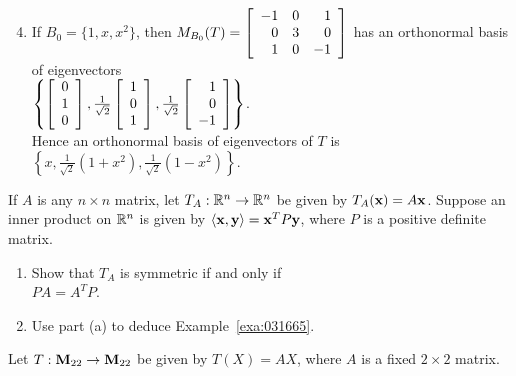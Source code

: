 \begin{multicols}{2}
\begin{ex}
\begin{sol}
\begin{enumerate}[label={\alph*.}]
\setcounter{enumi}{3}
\item If $B_{0} = \{1, x, x^{2}\}$, then $M_{B_0}(T) = 
\left[ \begin{array}{rrr}
-1 & 0 & 1 \\
0 & 3 & 0 \\
1 & 0 & -1
\end{array} \right]$ has an orthonormal basis of eigenvectors \\
$ \left\{
\left[ \begin{array}{r}
0 \\
1 \\
0
\end{array} \right]
,
\tfrac{1}{\sqrt{2}}
\left[ \begin{array}{r}
1 \\
0 \\
1
\end{array} \right]
,
\tfrac{1}{\sqrt{2}}
\left[ \begin{array}{r}
1 \\
0 \\
-1
\end{array} \right]
\right\}$. \\ Hence an orthonormal basis of eigenvectors of $T$ is $ \left\{x, \frac{1}{\sqrt{2}} (1 + x^2), \frac{1}{\sqrt{2}}(1 - x^2) \right\}$.

\end{enumerate}
\end{sol}
\end{ex}

\begin{ex}
If $A$ is any $n \times n$ matrix, let $T_{A} : \mathbb{R}^n \to \mathbb{R}^n$ be given by $T_{A}(\textbf{x}) = A\textbf{x}$. Suppose an inner product on $\mathbb{R}^n$ is given by $\langle\textbf{x}, \textbf{y} \rangle = \textbf{x}^{T}P\textbf{y}$, where $P$ is a positive definite matrix.

\begin{enumerate}[label={\alph*.}]
\item Show that $T_{A}$ is symmetric if and only if \\ $PA = A^{T}P$.

\item Use part (a) to deduce Example~\ref{exa:031665}.

\end{enumerate}
\end{ex}

\begin{ex} \label{ex:10_3_7}
Let $T : \textbf{M}_{22} \to \textbf{M}_{22}$ be given by \newline $T(X) = AX$, where $A$ is a fixed $2 \times 2$ matrix.


\end{ex}
\end{multicols}
